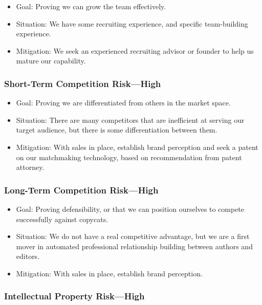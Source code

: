 \documentclass[10pt,openany]{book}
\providecommand{\tightlist}{%
  \setlength{\itemsep}{0pt}\setlength{\parskip}{0pt}}
\begin{document}
\begin{itemize}
\tightlist
\item
  Goal: Proving we can grow the team effectively.
\item
  Situation: We have some recruiting experience, and specific
  team-building experience.
\item
  Mitigation: We seek an experienced recruiting advisor or founder to
  help us mature our capability.
\end{itemize}

\hypertarget{short-term-competition-riskhigh}{%
\subsubsection{Short-Term Competition
Risk---High}\label{short-term-competition-riskhigh}}

\begin{itemize}
\tightlist
\item
  Goal: Proving we are differentiated from others in the market space.
\item
  Situation: There are many competitors that are inefficient at serving
  our target audience, but there is some differentiation between them.
\item
  Mitigation: With sales in place, establish brand perception and seek a
  patent on our matchmaking technology, based on recommendation from
  patent attorney.
\end{itemize}

\hypertarget{long-term-competition-riskhigh}{%
\subsubsection{Long-Term Competition
Risk---High}\label{long-term-competition-riskhigh}}

\begin{itemize}
\tightlist
\item
  Goal: Proving defensibility, or that we can position ourselves to
  compete successfully against copycats.
\item
  Situation: We do not have a real competitive advantage, but we are a
  first mover in automated professional relationship building between
  authors and editors.
\item
  Mitigation: With sales in place, establish brand perception.
\end{itemize}

\hypertarget{intellectual-property-riskhigh}{%
\subsubsection{Intellectual Property
Risk---High}\label{intellectual-property-riskhigh}}
\end{document}
